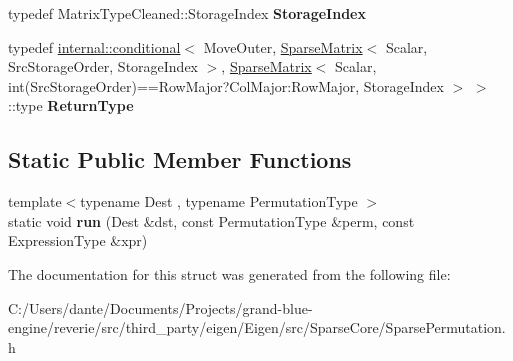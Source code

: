\begin{DoxyCompactItemize}
typedef Matrix\+Type\+Cleaned\+::\+Storage\+Index {\bfseries Storage\+Index}
\item 
\mbox{\label{struct_eigen_1_1internal_1_1permutation__matrix__product_3_01_expression_type_00_01_side_00_01_t20ccd76e9ac5a7579d51cf9e9a5cbb67_a818a2f8e4abf15cc3e3d4bab12c79717}} 
typedef \mbox{\hyperlink{struct_eigen_1_1internal_1_1conditional}{internal\+::conditional}}$<$ Move\+Outer, \mbox{\hyperlink{class_eigen_1_1_sparse_matrix}{Sparse\+Matrix}}$<$ Scalar, Src\+Storage\+Order, Storage\+Index $>$, \mbox{\hyperlink{class_eigen_1_1_sparse_matrix}{Sparse\+Matrix}}$<$ Scalar, int(Src\+Storage\+Order)==Row\+Major?Col\+Major\+:\+Row\+Major, Storage\+Index $>$ $>$\+::type {\bfseries Return\+Type}
\end{DoxyCompactItemize}
\subsection*{Static Public Member Functions}
\begin{DoxyCompactItemize}
\item 
\mbox{\label{struct_eigen_1_1internal_1_1permutation__matrix__product_3_01_expression_type_00_01_side_00_01_t20ccd76e9ac5a7579d51cf9e9a5cbb67_a8e9f0f979bf25617f84deb0624a3179c}} 
{\footnotesize template$<$typename Dest , typename Permutation\+Type $>$ }\\static void {\bfseries run} (Dest \&dst, const Permutation\+Type \&perm, const Expression\+Type \&xpr)
\end{DoxyCompactItemize}


The documentation for this struct was generated from the following file\+:\begin{DoxyCompactItemize}
\item 
C\+:/\+Users/dante/\+Documents/\+Projects/grand-\/blue-\/engine/reverie/src/third\+\_\+party/eigen/\+Eigen/src/\+Sparse\+Core/Sparse\+Permutation.\+h\end{DoxyCompactItemize}
